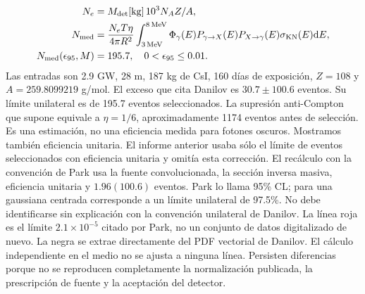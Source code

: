 \section{}
\begin{align}
N_e&=M_{\rm det}[{\rm kg}]\,10^3N_A Z/A,\\
N_{\rm med}&=\frac{N_eT\eta}{4\pi R^2}\int_{3\,{\rm MeV}}^{8\,{\rm MeV}}\Phi_\gamma(E)P_{\gamma\to X}(E)P_{X\to\gamma}(E)\sigma_{\rm KN}(E)\mathrm{d} E,\\
N_{\rm med}(\epsilon_{95},M)&=195.7,\quad 0<\epsilon_{95}\le0.01.
\end{align}
{Las entradas son 2.9 GW, 28 m, 187 kg de CsI, 160 días de exposición, $Z=108$ y $A=259.8099219$ g/mol. El exceso que cita Danilov es $30.7\pm100.6$ eventos. Su límite unilateral es de 195.7 eventos seleccionados. La supresión anti-Compton que supone equivale a $\eta=1/6$, aproximadamente 1174 eventos antes de selección. Es una estimación, no una eficiencia medida para fotones oscuros. Mostramos también eficiencia unitaria. El informe anterior usaba sólo el límite de eventos seleccionados con eficiencia unitaria y omitía esta corrección.}
{El recálculo con la convención de Park usa la fuente convolucionada, la sección inversa masiva, eficiencia unitaria y $1.96(100.6)$ eventos. Park lo llama 95\% CL; para una gaussiana centrada corresponde a un límite unilateral de 97.5\%. No debe identificarse sin explicación con la convención unilateral de Danilov. La línea roja es el límite $2.1\times10^{-5}$ citado por Park, no un conjunto de datos digitalizado de nuevo. La negra se extrae directamente del PDF vectorial de Danilov. El cálculo independiente en el medio no se ajusta a ninguna línea. Persisten diferencias porque no se reproducen completamente la normalización publicada, la prescripción de fuente y la aceptación del detector.}

